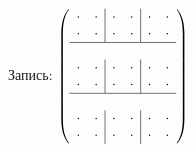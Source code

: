 \documentclass[12pt]{article}
\begin{document}
Запись: $\left(\begin{array}{cc|cc|cc}
    \cdot & \cdot & \cdot & \cdot & \cdot & \cdot\\
    \cdot & \cdot & \cdot & \cdot & \cdot & \cdot\\
    \hline\\
    \cdot & \cdot & \cdot & \cdot & \cdot & \cdot\\
    \cdot & \cdot & \cdot & \cdot & \cdot & \cdot\\
    \hline\\
    \cdot & \cdot & \cdot & \cdot & \cdot & \cdot\\
    \cdot & \cdot & \cdot & \cdot & \cdot & \cdot
\end{array}\right)$
\end{document}
